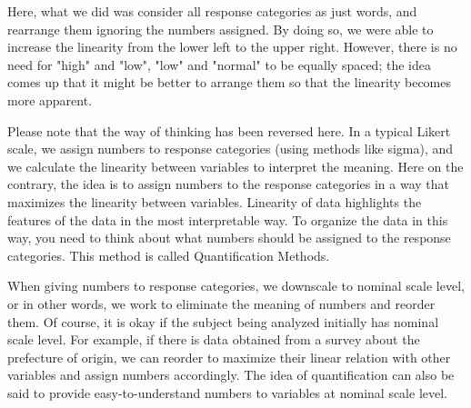 \documentclass{ltjsbook}
\begin{document}
Here, what we did was consider all response categories as just words, and rearrange them ignoring the numbers assigned. By doing so, we were able to increase the linearity from the lower left to the upper right. However, there is no need for "high" and "low", "low" and "normal" to be equally spaced; the idea comes up that it might be better to arrange them so that the linearity becomes more apparent.

Please note that the way of thinking has been reversed here. In a typical Likert scale, we assign numbers to response categories (using methods like sigma), and we calculate the linearity between variables to interpret the meaning.
Here on the contrary, the idea is to assign numbers to the response categories in a way that maximizes the linearity between variables. Linearity of data highlights the features of the data in the most interpretable way. To organize the data in this way, you need to think about what numbers should be assigned to the response categories. This method is called Quantification Methods.

When giving numbers to response categories, we downscale to nominal scale level, or in other words, we work to eliminate the meaning of numbers and reorder them. Of course, it is okay if the subject being analyzed initially has nominal scale level. For example, if there is data obtained from a survey about the prefecture of origin, we can reorder to maximize their linear relation with other variables and assign numbers accordingly. The idea of quantification can also be said to provide easy-to-understand numbers to variables at nominal scale level.
\end{document}
